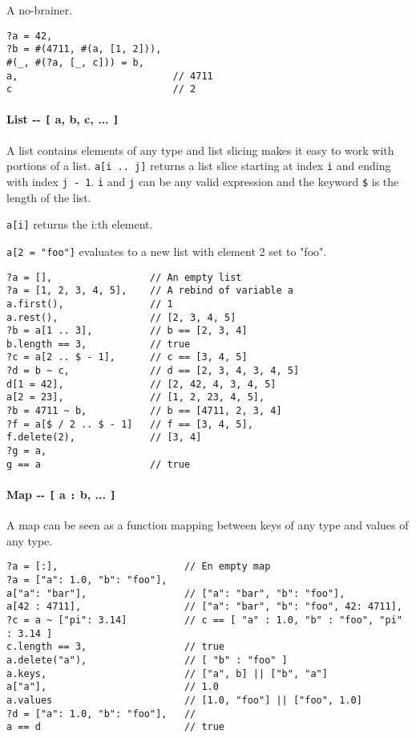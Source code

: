 A no-brainer.

\begin{verbatim}
?a = 42,
?b = #(4711, #(a, [1, 2])),
#(_, #(?a, [_, c])) = b,
a,                           // 4711
c                            // 2
\end{verbatim}

\hypertarget{list-----a-b-c--}{%
\paragraph{\texorpdfstring{List -\/- \texttt{{[}} a, b, c, ...
\texttt{{]}}}{List -\/- {[} a, b, c, ... {]}}}\label{list-----a-b-c--}}

A list contains elements of any type and list slicing makes it easy to
work with portions of a list. \texttt{a{[}i\ ..\ j{]}} returns a list
slice starting at index \texttt{i} and ending with index
\texttt{j\ -\ 1}. \texttt{i} and \texttt{j} can be any valid expression
and the keyword \texttt{\$} is the length of the list.

\texttt{a{[}i{]}} returns the i:th element.

\texttt{a{[}2\ =\ "foo"{]}} evaluates to a new list with element 2 set
to "foo".

\begin{verbatim}
?a = [],                 // An empty list
?a = [1, 2, 3, 4, 5],    // A rebind of variable a
a.first(),               // 1
a.rest(),                // [2, 3, 4, 5]
?b = a[1 .. 3],          // b == [2, 3, 4]
b.length == 3,           // true
?c = a[2 .. $ - 1],      // c == [3, 4, 5]
?d = b ~ c,              // d == [2, 3, 4, 3, 4, 5]
d[1 = 42],               // [2, 42, 4, 3, 4, 5]
a[2 = 23],               // [1, 2, 23, 4, 5],
?b = 4711 ~ b,           // b == [4711, 2, 3, 4]
?f = a[$ / 2 .. $ - 1]   // f == [3, 4, 5],
f.delete(2),             // [3, 4]
?g = a,
g == a                   // true
\end{verbatim}

\hypertarget{map-----a--b--}{%
\paragraph{\texorpdfstring{Map -\/- \texttt{{[}} a \texttt{:} b, ...
\texttt{{]}}}{Map -\/- {[} a : b, ... {]}}}\label{map-----a--b--}}

A map can be seen as a function mapping between keys of any type and
values of any type.

\begin{verbatim}
?a = [:],                      // En empty map
?a = ["a": 1.0, "b": "foo"],
a["a": "bar"],                 // ["a": "bar", "b": "foo"],
a[42 : 4711],                  // ["a": "bar", "b": "foo", 42: 4711],
?c = a ~ ["pi": 3.14]          // c == [ "a" : 1.0, "b" : "foo", "pi" : 3.14 ]
c.length == 3,                 // true
a.delete("a"),                 // [ "b" : "foo" ]
a.keys,                        // ["a", b] || ["b", "a"]
a["a"],                        // 1.0
a.values                       // [1.0, "foo"] || ["foo", 1.0]
?d = ["a": 1.0, "b": "foo"],   //
a == d                         // true
\end{verbatim}

